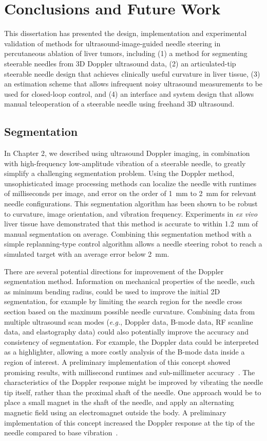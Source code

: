 \chapter[Conclusions and Future Work]{Conclusions and Future Work}
This dissertation has presented the design, implementation and experimental validation of methods for ultrasound-image-guided needle steering in percutaneous ablation of liver tumors, including (1) a method for segmenting steerable needles from 3D Doppler ultrasound data, (2) an articulated-tip steerable needle design that achieves clinically useful curvature in liver tissue, (3) an estimation scheme that allows infrequent noisy ultrasound measurements to be used for closed-loop control, and (4) an interface and system design that allows manual teleoperation of a steerable needle using freehand 3D ultrasound. 

\section{Segmentation}
In Chapter 2, we described using ultrasound Doppler imaging, in combination with high-frequency low-amplitude vibration of a steerable needle, to greatly simplify a challenging segmentation problem. Using the Doppler method, unsophisticated image processing methods can localize the needle with runtimes of milliseconds per image, and error on the order of 1~mm to 2~mm for relevant needle configurations. This segmentation algorithm has been shown to be robust to curvature, image orientation, and vibration frequency. Experiments in \textit{ex vivo} liver tissue have demonstrated that this method is accurate to within 1.2~mm of manual segmentation on average. Combining this segmentation method with a simple replanning-type control algorithm allows a needle steering robot to reach a simulated target with an average error below 2~mm. 

There are several potential directions for improvement of the Doppler segmentation method. Information on mechanical properties of the needle, such as minimum bending radius, could be used to improve the initial 2D segmentation, for example by limiting the search region for the needle cross section based on the maximum possible needle curvature. Combining data from multiple ultrasound scan modes (\textit{e.g.}, Doppler data, B-mode data, RF scanline data, and elastography data) could also potentially improve the accuracy and consistency of segmentation. For example, the Doppler data could be interpreted as a highlighter, allowing a more costly analysis of the B-mode data inside a region of interest. A preliminary implementation of this concept showed promising results, with millisecond runtimes and sub-millimeter accuracy~\cite{Greer2014}. The characteristics of the Doppler response might be improved by vibrating the needle tip itself, rather than the proximal shaft of the needle. One approach would be to place a small magnet in the shaft of the needle, and apply an alternating magnetic field using an electromagnet outside the body. A preliminary implementation of this concept increased the Doppler response at the tip of the needle compared to base vibration~\cite{Cabreros2014}.

